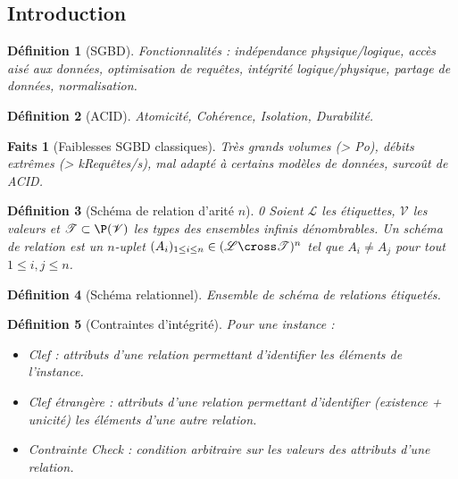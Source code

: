 \documentclass[landscape]{article}
\newcommand{\L}{\mathscr{L}}
\newcommand{\V}{\mathscr{V}}
\newcommand{\T}{\mathscr{T}}
\newcommand{\1}{\mathbbm{1}}
\newtheorem{defi}{Définition}
\newtheorem{fact}{Faits}
\begin{document}
\begin{multicols}{2}

    \section{Introduction}

    \begin{defi}[SGBD] Fonctionnalités : indépendance physique/logique, accès aisé
        aux données, optimisation de requêtes, intégrité logique/physique,
        partage de données, normalisation.
    \end{defi}

    \begin{defi}[ACID] Atomicité, Cohérence, Isolation, Durabilité.
    \end{defi}

    \begin{fact}[Faiblesses SGBD classiques] Très grands volumes (> Po), débits
        extrêmes (> kRequêtes/s), mal adapté à certains modèles de données, surcoût
        de ACID.
    \end{fact}

    \begin{defi}[Schéma de relation d'arité $n$]0
        Soient $\L$ les étiquettes, $\V$ les valeurs et $\T\subset\P(\V)$ les types
        des ensembles infinis dénombrables. Un schéma de relation est un $n$-uplet
        $(A_i)_{1\leq i \leq n}\in(\L\cross \T)^n$ tel que $A_i\neq A_j$ pour tout
        $1\leq i,j\leq n$.
    \end{defi}

    \begin{defi}[Schéma relationnel] Ensemble de schéma de relations étiquetés.
    \end{defi}

    \begin{defi}[Contraintes d'intégrité] Pour une instance :\begin{itemize}
        \item Clef : attributs d'une relation permettant d'identifier les
            éléments de l'instance.
        \item Clef étrangère : attributs d'une relation permettant d'identifier
            (existence + unicité) les éléments d'une autre relation.
        \item Contrainte Check : condition arbitraire sur les valeurs des attributs
            d'une relation.
    \end{itemize}\end{defi}


\end{multicols}
\end{document}
